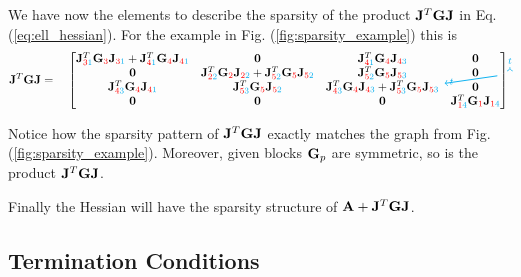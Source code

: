 We have now the elements to describe the sparsity of the product
${\mathbf{J}}^T{\mathbf{G}}{\mathbf{J}}$ in Eq. (\ref{eq:ell_hessian}). For the example in Fig.
(\ref{fig:sparsity_example}) this is
\begin{equation}
	\mf{J}^T\mf{G}\mf{J}=\quad
	\begin{bmatrix}
		\tikzmark{JTGJ_topleft}
		\JTGJ{3}{1}{1} + \JTGJ{4}{1}{1} & \mf{0} & \JTGJ{4}{1}{3} & \mf{0}
		\tikzmark{JTGJ_topright}\\		
		\mf{0} & \JTGJ{2}{2}{2} + \JTGJ{5}{2}{2} & \JTGJ{5}{2}{3} & \mf{0}\\
		\JTGJ{4}{3}{1} & \JTGJ{5}{3}{2} & \JTGJ{4}{3}{3} + \JTGJ{5}{3}{3} & \mf{0}\\
		\tikzmark{JTGJ_bottomleft}
		\mf{0} & \mf{0} & \mf{0} & \JTGJ{1}{4}{4}\\
	\end{bmatrix}
	\label{eq:JTGJ_sparsity}
\tikz[overlay,remember picture] {
	\draw[->,thick,color=cyan]
  ([yshift=3ex]JTGJ_topleft) -- ([yshift=3ex]JTGJ_topright) node[midway,above]
  {\scriptsize $t$}; 
  \draw[->,thick,color=cyan]
  ([yshift=1.5ex,xshift=-2.5ex]JTGJ_topleft) -- ([xshift=-13ex]JTGJ_bottomleft)
  node[near end,left] {\scriptsize $t$};}	
\end{equation}

Notice how the sparsity pattern of ${\mathbf{J}}^T{\mathbf{G}}{\mathbf{J}}$ exactly matches the
graph from Fig. (\ref{fig:sparsity_example}). Moreover, given blocks ${\mathbf{G}}_p$
are symmetric, so is the product ${\mathbf{J}}^T{\mathbf{G}}{\mathbf{J}}$.

Finally the Hessian will have the sparsity structure of ${\mathbf{A}} +
{\mathbf{J}}^T{\mathbf{G}}{\mathbf{J}}$. 


\subsection{Termination Conditions}
